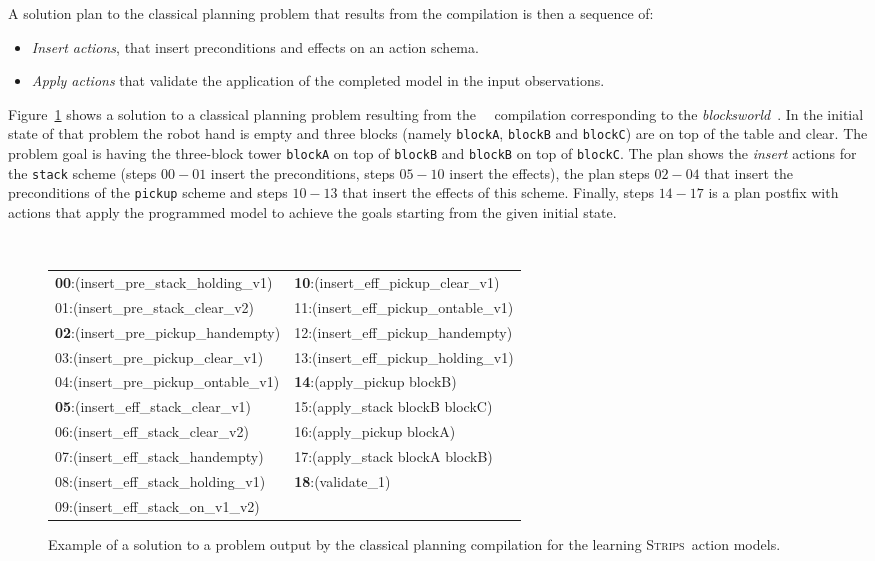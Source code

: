 \documentclass{article}
\newcommand{\strips}{\textsc{Strips}}
\begin{document}
A solution plan to the classical planning problem that results from the compilation is then a sequence of:
\begin{itemize}
\item \emph{Insert actions}, that insert preconditions and effects on an action schema.
\item \emph{Apply actions} that validate the application of the completed model in the input observations.
\end{itemize}
Figure~\ref{fig:plan-lplan} shows a solution to a classical planning problem resulting from the~\citeauthor{aineto2018learning}~\citeyear{aineto2018learning} compilation corresponding to the {\em blocksworld}~\cite{slaney2001blocks}. In the initial state of that problem the robot hand is empty and three blocks (namely {\small\tt blockA}, {\small\tt blockB} and {\small\tt blockC}) are on top of the table and clear. The problem goal is having the three-block tower {\tt blockA} on top of {\tt blockB} and {\tt blockB} on top of {\tt blockC}. The plan shows the {\em insert} actions for the {\tt\small stack} scheme (steps $00-01$ insert the preconditions, steps $05-10$ insert the effects), the plan steps $02-04$ that  insert the preconditions of the {\tt\small pickup} scheme and steps $10-13$ that insert the effects of this scheme. Finally, steps $14-17$ is a plan postfix with actions that apply the programmed model to achieve the goals starting from the given initial state. 

\begin{figure}[hbt!]
	{\tiny\tt
\begin{tabular}{ll}
		{\bf 00}:(insert\_pre\_stack\_holding\_v1) & {\bf 10}:(insert\_eff\_pickup\_clear\_v1) \\
		01:(insert\_pre\_stack\_clear\_v2) & 11:(insert\_eff\_pickup\_ontable\_v1)\\
                {\bf 02}:(insert\_pre\_pickup\_handempty) & 12:(insert\_eff\_pickup\_handempty)\\
                03:(insert\_pre\_pickup\_clear\_v1) & 13:(insert\_eff\_pickup\_holding\_v1)\\
                04:(insert\_pre\_pickup\_ontable\_v1) & {\bf 14}:(apply\_pickup blockB)\\
                {\bf 05}:(insert\_eff\_stack\_clear\_v1) & 15:(apply\_stack blockB blockC)\\
                06:(insert\_eff\_stack\_clear\_v2) & 16:(apply\_pickup blockA)\\
                07:(insert\_eff\_stack\_handempty) & 17:(apply\_stack blockA blockB) \\
                08:(insert\_eff\_stack\_holding\_v1) &  {\bf 18}:(validate\_1)\\
                09:(insert\_eff\_stack\_on\_v1\_v2) &             		 
\end{tabular}
}
	\caption{\small Example of a solution to a problem output by the classical planning compilation for the learning \strips\ action models.}
	\label{fig:plan-lplan}
\end{figure}
\end{document}
